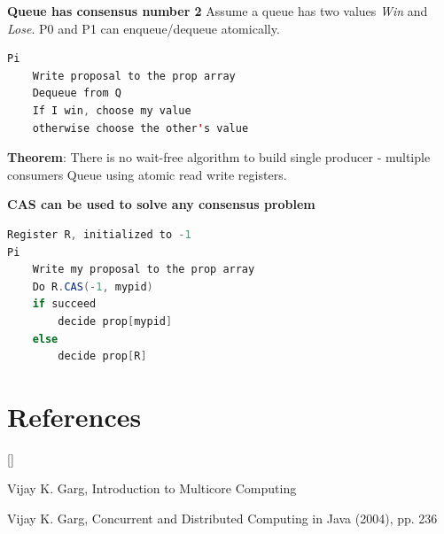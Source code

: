 \documentclass[twoside]{article}
\def\beginrefs{\begin{list}%
        {[\arabic{equation}]}{\usecounter{equation}
         \setlength{\leftmargin}{2.0truecm}\setlength{\labelsep}{0.4truecm}%
         \setlength{\labelwidth}{1.6truecm}}}
\def\endrefs{\end{list}}
\def\bibentry#1{\item[\hbox{[#1]}]}
\begin{document}
\textbf{Queue has consensus number 2}
Assume a queue has two values \textit{Win} and \textit{Lose}. P0 and P1 can enqueue/dequeue atomically.
\begin{center}
\renewcommand{\lstlistingname}{Consensus}
\begin{lstlisting}[language=Java, caption=Consensus with Queue, frame=single, basicstyle=\small]
Pi
    Write proposal to the prop array
    Dequeue from Q
    If I win, choose my value
    otherwise choose the other's value
\end{lstlisting}
\end{center}

\textbf{Theorem}: There is no wait-free algorithm to build single producer - multiple consumers Queue using atomic read write registers.

\textbf{CAS can be used to solve any consensus problem}
\begin{center}
\renewcommand{\lstlistingname}{Consensus}
\begin{lstlisting}[language=Java, caption=Consensus with CAS, frame=single, basicstyle=\small]
Register R, initialized to -1
Pi
    Write my proposal to the prop array
    Do R.CAS(-1, mypid)
    if succeed
        decide prop[mypid]
    else
        decide prop[R]
\end{lstlisting}
\end{center}


\section*{References}
\beginrefs
\bibentry{1}{\sc Vijay K. Garg},
 Introduction to Multicore Computing
\bibentry{1}{\sc Vijay K. Garg},
Concurrent and Distributed Computing in Java (2004), pp. 236
\endrefs
\end{document}
